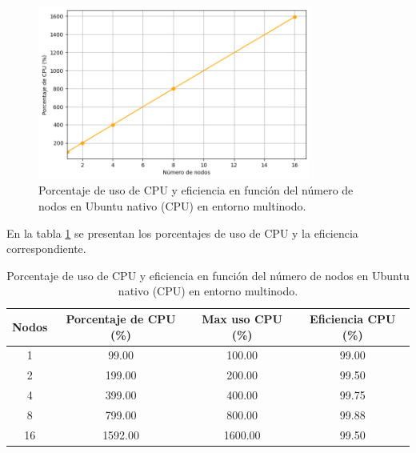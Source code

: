 \begin{figure}[H]
    \centering
    \includegraphics[width=0.8\textwidth]{imagenes/cap5/multi-node_ubuntu_cpu_native_cpu_time.png}
    \caption{Porcentaje de uso de CPU y eficiencia en función del número de nodos en Ubuntu nativo (CPU) en entorno multinodo.}
    \label{fig:multi-node_ubuntu_cpu_native_cpu}
\end{figure}

En la tabla \ref{tab:multi-node_ubuntu_cpu_native_cpu} se presentan los porcentajes de uso de CPU y la eficiencia correspondiente.

\begin{table}[ht]
    \centering
    \small
    \setlength{\tabcolsep}{4pt}
    \renewcommand{\arraystretch}{1.1}
    \begin{tabular}{|c|c|c|c|}
        \hline
        \textbf{Nodos} & \textbf{Porcentaje de CPU (\%)} & \textbf{Max uso CPU (\%)} & \textbf{Eficiencia CPU (\%)} \\
        \hline
        1              & 99.00                           & 100.00                    & 99.00                        \\
        2              & 199.00                          & 200.00                    & 99.50                        \\
        4              & 399.00                          & 400.00                    & 99.75                        \\
        8              & 799.00                          & 800.00                    & 99.88                        \\
        16             & 1592.00                         & 1600.00                   & 99.50                        \\
        \hline
    \end{tabular}
    \caption{Porcentaje de uso de CPU y eficiencia en función del número de nodos en Ubuntu nativo (CPU) en entorno multinodo.}
    \label{tab:multi-node_ubuntu_cpu_native_cpu}
\end{table}

